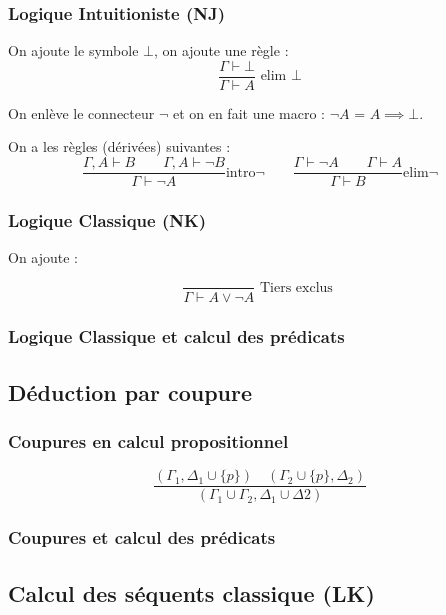 \documentclass[french]{article}
\begin{document}
\subsubsection{Logique Intuitioniste (NJ)}

On ajoute le symbole $\bot$, on ajoute une règle :
\[\dfrac{\Gamma\vdash\bot}{\Gamma\vdash A}\text{ elim }\bot\]

On enlève le connecteur $\neg$ et on en fait une macro : $\neg A$ = $A\implies\bot$.

On a les règles (dérivées) suivantes :
$$\frac{\Gamma, A\vdash B\qquad \Gamma, A\vdash\neg B}{\Gamma\vdash\neg A}\text{intro}\neg\qquad \frac{\Gamma\vdash\neg A\qquad \Gamma\vdash A}{\Gamma\vdash B}\text{elim}\neg$$


\subsubsection{Logique Classique (NK)}

On ajoute : 

\[\dfrac{}{\Gamma\vdash A\vee\neg A}\text{ Tiers exclus }\]

\subsubsection{Logique Classique et calcul des prédicats}


\subsection{Déduction par coupure}

\subsubsection{Coupures en calcul propositionnel}

\[\dfrac{(\Gamma_1,\Delta_1\cup\{p\}) \quad (\Gamma_2\cup\{p\}, \Delta_2)}{(\Gamma_1\cup\Gamma_2, \Delta_1\cup\Delta2)}\]


\subsubsection{Coupures et calcul des prédicats}


\subsection{Calcul des séquents classique (LK)}
\end{document}
